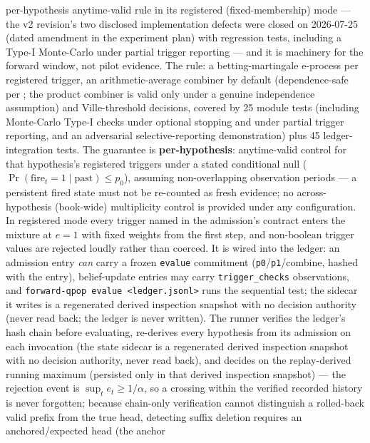 \documentclass[11pt]{article}
\begin{document}
\begin{itemize}
{    per-hypothesis anytime-valid rule in its registered (fixed-membership) mode --- the v2
    revision's two disclosed implementation defects were closed on 2026-07-25 (dated amendment in
    the experiment plan) with regression tests, including a Type-I Monte-Carlo under partial
    trigger reporting --- and it is machinery for the forward window, not pilot evidence. The rule: a
    betting-martingale e-process per registered trigger, an arithmetic-average combiner by default
    (dependence-safe per \citet{vovk2021evalues}; the product combiner is valid only under a genuine
    independence assumption) and Ville-threshold decisions, covered by 25 module tests (including
    Monte-Carlo Type-I checks under optional stopping and under partial trigger reporting, and an
    adversarial selective-reporting demonstration) plus
    45 ledger-integration tests. The
    guarantee is \textbf{per-hypothesis}: anytime-valid control
    for that hypothesis's
    registered triggers under a stated conditional null ($\Pr(\text{fire}_t = 1 \mid \text{past})
    \leq p_0$), assuming non-overlapping observation periods --- a persistent fired state must not be
    re-counted as fresh evidence; no across-hypothesis (book-wide) multiplicity control is provided
    under any configuration. In registered mode every trigger named in the admission's contract
    enters the mixture at $e = 1$ with fixed weights from the first step, and non-boolean trigger
    values are rejected loudly rather than coerced.
    It is wired into the ledger: an admission entry \emph{can} carry a frozen \texttt{evalue}
    commitment (\texttt{p0}/\texttt{p1}/combine, hashed with the entry), belief-update entries may
    carry \texttt{trigger\_checks} observations, and \texttt{forward-qpop evalue <ledger.jsonl>} runs
    the sequential test; the sidecar it writes is a regenerated derived inspection snapshot with
    no decision authority (never read back; the ledger is never written).
    The runner verifies the ledger's hash chain before evaluating, re-derives every hypothesis
    from its admission on each invocation (the state sidecar is a regenerated derived inspection
    snapshot with no decision authority, never read back), and decides on the replay-derived
    running maximum (persisted only in that derived inspection snapshot) --- the rejection event is
    $\sup_t e_t \geq 1/\alpha$, so a crossing within the verified recorded history is never
    forgotten; because chain-only verification cannot distinguish a rolled-back valid prefix from
    the true head, detecting suffix deletion requires an anchored/expected head (the anchor
}
\end{itemize}
\end{document}
